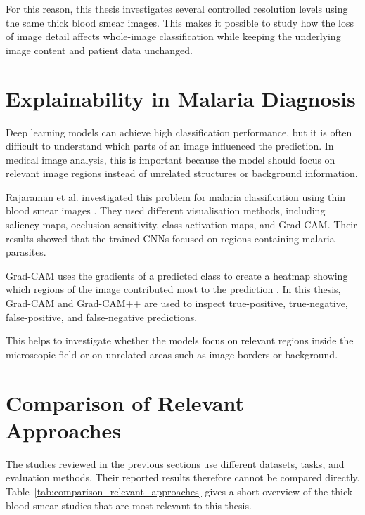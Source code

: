 For this reason, this thesis investigates several controlled resolution levels using the same thick blood smear images. This makes it possible to study how the loss of image detail affects whole-image classification while keeping the underlying image content and patient data unchanged.

\section{Explainability in Malaria Diagnosis}
\label{sec:explainability}

Deep learning models can achieve high classification performance, but it is often difficult to understand which parts of an image influenced the prediction. In medical image analysis, this is important because the model should focus on relevant image regions instead of unrelated structures or background information.

Rajaraman et al. investigated this problem for malaria classification using thin blood smear images \cite{Rajaraman2018Explainability}. They used different visualisation methods, including saliency maps, occlusion sensitivity, class activation maps, and Grad-CAM. Their results showed that the trained CNNs focused on regions containing malaria parasites.

Grad-CAM uses the gradients of a predicted class to create a heatmap showing which regions of the image contributed most to the prediction \cite{Selvaraju2017}. In this thesis, Grad-CAM and Grad-CAM++ are used to inspect true-positive, true-negative, false-positive, and false-negative predictions.

This helps to investigate whether the models focus on relevant regions inside the microscopic field or on unrelated areas such as image borders or background.

\section{Comparison of Relevant Approaches}
\label{sec:comparison_approaches}

The studies reviewed in the previous sections use different datasets, tasks, and evaluation methods. Their reported results therefore cannot be compared directly. Table~\ref{tab:comparison_relevant_approaches} gives a short overview of the thick blood smear studies that are most relevant to this thesis.

